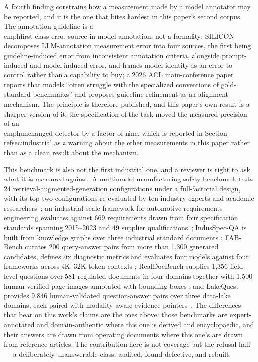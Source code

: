 \documentclass[preprint,3p,times]{elsarticle}
\begin{document}
A fourth finding constrains how a measurement made by a model annotator may be
reported, and it is the one that bites hardest in this paper's second
corpus. The annotation guideline is a \\emph{first-class error source} in
model annotation, not a formality: SILICON decomposes LLM-annotation
measurement error into four sources, the first being guideline-induced error
from inconsistent annotation criteria, alongside prompt-induced and
model-induced error, and frames model identity as an error to control rather
than a capability to buy\cite{cheng2024silicon}; a 2026 ACL main-conference
paper reports that models ``often struggle with the specialized conventions
of gold-standard benchmarks'' and proposes guideline refinement as an
alignment mechanism\cite{kim2026guidelines}. The principle is therefore
published, and this paper's own result is a sharper version of it: the
specification of the task moved the measured precision of an \\emph{unchanged}
detector by a factor of nine, which is reported in
Section~\\ref{sec:industrial} as a warning about the other measurements in
this paper rather than as a clean result about the mechanism.

This benchmark is also not the first industrial one, and a reviewer is right to
ask what it is measured against. A multimodal manufacturing safety benchmark
tests 24 retrieval-augmented-generation configurations under a full-factorial
design, with its top two configurations re-evaluated by ten industry experts
and academic researchers~\cite{singh2025manufacturing}; an industrial-scale
framework for automotive requirements engineering evaluates against 669
requirements drawn from four specification standards spanning 2015--2023 and
49 supplier qualifications~\cite{khalid2026automotive}; IndusSpec-QA is built
from knowledge graphs over three industrial standard documents
\cite{park2026induspecqa}; FAB-Bench curates 200 query-answer pairs from more
than 1{,}300 generated candidates, defines six diagnostic metrics and evaluates
four models against four frameworks across 4K--32K-token contexts
\cite{qian2026fabbench}; RealDocBench supplies 1{,}356 field-level questions
over 581 regulated documents in four domains together with 1{,}500
human-verified page images annotated with bounding boxes
\cite{joshi2026realdocbench}; and LakeQuest provides 9{,}846 human-validated
question-answer pairs over three data-lake domains, each paired with
modality-aware evidence pointers~\cite{solodko2026lakequest}. The differences
that bear on this work's claims are the ones above: those benchmarks are
expert-annotated and domain-authentic where this one is derived and
encyclopaedic, and their answers are drawn from operating documents where this
one's are drawn from reference articles. The contribution here is not coverage
but the refusal half --- a deliberately unanswerable class, audited, found
defective, and rebuilt.
\end{document}
